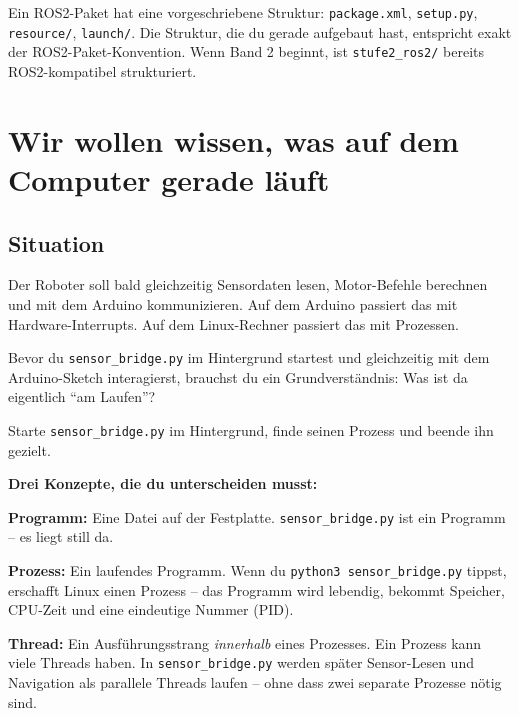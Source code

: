 \begin{robotikBox}
Ein ROS2-Paket hat eine vorgeschriebene Struktur:
\texttt{package.xml}, \texttt{setup.py}, \texttt{resource/},
\texttt{launch/}. Die Struktur, die du gerade aufgebaut hast,
entspricht exakt der ROS2-Paket-Konvention.
Wenn Band 2 beginnt, ist \texttt{stufe2\_ros2/} bereits
ROS2-kompatibel strukturiert.
\end{robotikBox}

\chapter{Wir wollen wissen, was auf dem Computer gerade läuft}

\kapitelstruktur

\section{Situation}

Der Roboter soll bald gleichzeitig Sensordaten lesen,
Motor-Befehle berechnen und mit dem Arduino kommunizieren.
Auf dem Arduino passiert das mit Hardware-Interrupts.
Auf dem Linux-Rechner passiert das mit Prozessen.

Bevor du \texttt{sensor\_bridge.py} im Hintergrund startest
und gleichzeitig mit dem Arduino-Sketch interagierst,
brauchst du ein Grundverständnis: Was ist da eigentlich
\enquote{am Laufen}?

\begin{aufgabeBox}
Starte \texttt{sensor\_bridge.py} im Hintergrund, finde seinen
Prozess und beende ihn gezielt.
\end{aufgabeBox}

\begin{wissenBox}
\textbf{Drei Konzepte, die du unterscheiden musst:}

\textbf{Programm:} Eine Datei auf der Festplatte.
\texttt{sensor\_bridge.py} ist ein Programm -- es liegt still da.

\textbf{Prozess:} Ein laufendes Programm. Wenn du
\texttt{python3 sensor\_bridge.py} tippst, erschafft Linux
einen Prozess -- das Programm wird lebendig, bekommt
Speicher, CPU-Zeit und eine eindeutige Nummer (PID).

\textbf{Thread:} Ein Ausführungsstrang \emph{innerhalb} eines Prozesses.
Ein Prozess kann viele Threads haben. In \texttt{sensor\_bridge.py}
werden später Sensor-Lesen und Navigation als parallele Threads
laufen -- ohne dass zwei separate Prozesse nötig sind.
\end{wissenBox}


